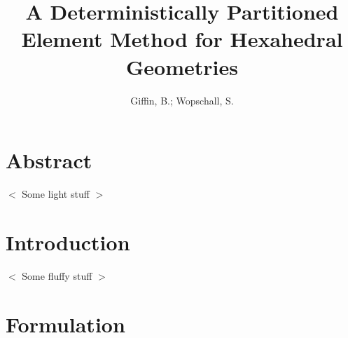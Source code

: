\documentclass[11pt]{article} %
\title{\textbf{A Deterministically Partitioned Element Method for Hexahedral Geometries}}
\author{Giffin, B.; Wopschall, S.}
\date{}
\begin{document}
\maketitle

\section{Abstract}

$<$ Some light stuff $>$

\section{Introduction}

$<$ Some fluffy stuff $>$

\section{Formulation}
\end{document}
